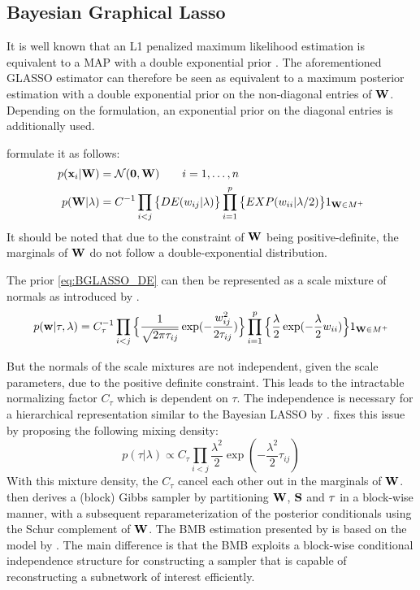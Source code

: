 \subsection{Bayesian Graphical Lasso}
\label{BGLASSO}
It is well known that an L1 penalized maximum likelihood estimation is equivalent to a \gls{MAP} with a double exponential prior \citep{tibshirani1996regression}.
The aforementioned GLASSO estimator can therefore be seen as equivalent to a maximum posterior estimation with a double exponential prior on the non-diagonal entries of $\mathbf{W}$.
Depending on the formulation, an exponential prior on the diagonal entries is additionally used.

\citet{wang_bayesian_2012} formulate it as follows:
\begin{align}
	\label{eq:BGLASSO_DE}
	p(\mathbf{x}_i|\mathbf{W}) & = \mathcal{N}(\mathbf{0},\mathbf{W}) \quad \quad i=1,\dots,n 
	\\
	p(\mathbf{W}|\lambda)    & = C^{-1} \prod_{i<j}\big\{                               
	DE(w_{ij}|\lambda)
	\big\}
	\prod_{i=1}^{p} \big\{
	EXP(w_{ii}|\lambda/2)
	\big\}
	1_{\mathbf{W}\in M^+}
	\nonumber
\end{align}
It should be noted that due to the constraint of $\mathbf{W}$ being positive-definite, the marginals
of $\mathbf{W}$ do not follow a double-exponential distribution.

The prior \autoref{eq:BGLASSO_DE} can then be represented as a scale mixture of
normals as introduced by \citet{west_scale_1987}. 
\begin{equation}
	p(\mathbf{w}|\tau, \lambda) = C_\tau^{-1} \prod_{i<j}
	\Big\{
	\frac{1}{\sqrt{2\pi\tau_{ij}}} \exp (- \frac{w_{ij}^2}{2\tau_{ij}})
	\Big\}
	\prod_{i=1}^{p}
	\Big\{
	\frac{\lambda}{2}
	\exp(-\frac{\lambda}{2}w_{ii})
	\Big\}
	1_{\mathbf{W}\in M^+}
\end{equation}

But the normals of the scale mixtures are not independent, given the scale parameters,
due to the positive definite constraint.
This leads to the intractable normalizing factor $C_\tau$ which is dependent on $\tau$.
The independence is necessary for a hierarchical representation similar to the Bayesian LASSO by \citet{park2008bayesian}.
\citet{wang_bayesian_2012} fixes this issue by proposing the following mixing density:
$$
p(\tau|\lambda) \propto C_\tau \prod_{i<j} \frac{\lambda^2}{2}\exp(- \frac{\lambda^2}{2} \tau_{ij})
$$
With this mixture density, the $C_\tau$ cancel each other out in the marginals of $\mathbf{W}$.
\citet{wang_bayesian_2012} then derives a (block) Gibbs sampler by partitioning $\mathbf{W}$, $\mathbf{S}$ and $\mathbf{\tau}$ in a block-wise manner, with a subsequent reparameterization of the posterior conditionals using the Schur complement of $\mathbf{W}$.
The \gls{BMB} estimation presented by \citet{kaufmann_bayesian_2015} is based on the model by \citet{wang_bayesian_2012}.
The main difference is that the \gls{BMB} exploits a block-wise conditional independence structure
for constructing a sampler that is capable of reconstructing a subnetwork of interest efficiently.